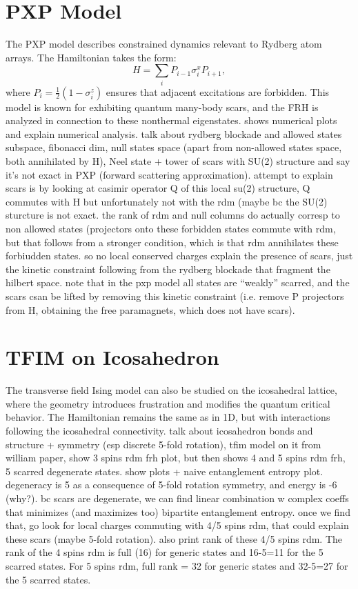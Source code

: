 \documentclass{article}
\begin{document}
\section{PXP Model}
The PXP model describes constrained dynamics relevant to Rydberg atom arrays. The Hamiltonian takes the form:
\begin{equation}
    H = \sum_i P_{i-1} \sigma^x_i P_{i+1},
\end{equation}
where $P_i = \frac{1}{2} (1 - \sigma^z_i)$ ensures that adjacent excitations are forbidden. This model is known for exhibiting quantum many-body scars, and the FRH is analyzed in connection to these nonthermal eigenstates. shows numerical plots and explain numerical analysis. talk about rydberg blockade and allowed states subspace, fibonacci dim, null states space (apart from non-allowed states space, both annihilated by H), Neel state + tower of scars with SU(2) structure and say it's not exact in PXP (forward scattering approximation). attempt to explain scars is by looking at casimir operator Q of this local su(2) structure, Q commutes with H but unfortunately not with the rdm (maybe bc the SU(2) sturcture is not exact. the rank of rdm and null columns do actually corresp to non allowed states (projectors onto these forbidden states commute with rdm, but that follows from a stronger condition, which is that rdm annihilates these forbiudden states. so no local conserved charges explain the presence of scars, just the kinetic constraint following from the rydberg blockade that fragment the hilbert space. note that in the pxp model all states are ``weakly'' scarred, and the scars csan be lifted by removing this kinetic constraint (i.e. remove P projectors from H, obtaining the free paramagnets, which does not have scars).

\section{TFIM on Icosahedron}
The transverse field Ising model can also be studied on the icosahedral lattice, where the geometry introduces frustration and modifies the quantum critical behavior. The Hamiltonian remains the same as in 1D, but with interactions following the icosahedral connectivity. talk about icosahedron bonds  and structure + symmetry (esp discrete 5-fold rotation), tfim model on it from william paper, show 3 spins rdm frh plot, but then shows 4 and 5 spins rdm frh, 5 scarred degenerate states. show plots + naive entanglement entropy plot. degeneracy is 5 as a consequence of 5-fold rotation symmetry, and energy is -6 (why?). bc scars are  degenerate, we can find linear combination w complex coeffs that minimizes (and maximizes too) bipartite entanglement entropy. once we find that, go look for local charges commuting with 4/5 spins rdm, that could explain these scars (maybe 5-fold rotation). also print rank of these 4/5 spins rdm. The rank of the 4 spins rdm is full (16) for generic states and 16-5=11 for the 5 scarred states. For 5 spins rdm, full rank = 32 for generic states and 32-5=27 for the 5 scarred states.
\end{document}
